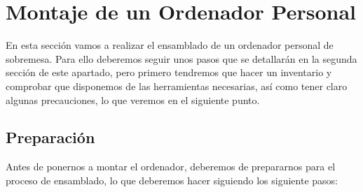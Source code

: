 \section{Montaje de un Ordenador Personal}
En esta sección vamos a realizar el ensamblado de un ordenador personal de sobremesa. Para ello deberemos seguir unos pasos que se detallarán en la segunda sección de este apartado, pero primero tendremos que hacer un inventario y comprobar que disponemos de las herramientas necesarias, así como tener claro algunas precauciones, lo que veremos en el siguiente punto.

\subsection{Preparación}
Antes de ponernos a montar el ordenador, deberemos de prepararnos para el proceso de ensamblado, lo que deberemos hacer siguiendo los siguiente pasos:

